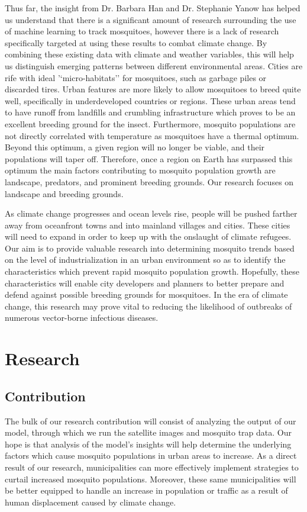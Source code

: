 \documentclass[11pt]{article}
\begin{document}
Thus far, the insight from Dr. Barbara Han and Dr. Stephanie Yanow has helped us understand that there is a significant amount of research surrounding the use of machine learning to track mosquitoes, however there is a lack of research specifically targeted at using these results to combat climate change. By combining these existing data with climate and weather variables, this will help us distinguish emerging patterns between different environmental areas. Cities are rife with ideal '‘micro-habitats’' for mosquitoes, such as garbage piles or discarded tires. Urban features are more likely to allow mosquitoes to breed quite well, specifically in underdeveloped countries or regions. These urban areas tend to have runoff from landfills and crumbling infrastructure which proves to be an excellent breeding ground for the insect. Furthermore, mosquito populations are not directly correlated with temperature as mosquitoes have a thermal optimum. Beyond this optimum, a given region will no longer be viable, and their populations will taper off. Therefore, once a region on Earth has surpassed this optimum the main factors contributing to mosquito population growth are landscape, predators, and prominent breeding grounds. Our research focuses on landscape and breeding grounds.

As climate change progresses and ocean levels rise, people will be pushed farther away from oceanfront towns and into mainland villages and cities. These cities will need to expand in order to keep up with the onslaught of climate refugees. Our aim is to provide valuable research into determining mosquito trends based on the level of industrialization in an urban environment so as to identify the characteristics which prevent rapid mosquito population growth. Hopefully, these characteristics will enable city developers and planners to better prepare and defend against possible breeding grounds for mosquitoes. In the era of climate change, this research may prove vital to reducing the likelihood of outbreaks of numerous vector-borne infectious diseases.

\section{Research}
\subsection{Contribution}
The bulk of our research contribution will consist of analyzing the output of our model, through which we run the satellite images and mosquito trap data. Our hope is that analysis of the model’s insights will help determine the underlying factors which cause mosquito populations in urban areas to increase. As a direct result of our research, municipalities can more effectively implement strategies to curtail increased mosquito populations. Moreover, these same municipalities will be better equipped to handle an increase in population or traffic as a result of human displacement caused by climate change.
\end{document}

